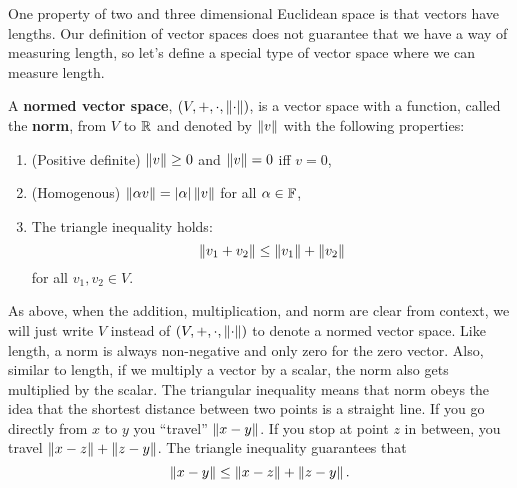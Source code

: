 One property of two and three dimensional Euclidean space is that
vectors have lengths. Our definition of vector spaces does not
guarantee that we have a way of measuring length, so let's define a
special type of vector space where we can measure length. 
\begin{definition}
  A \textbf{normed vector space}, $(V,+,\cdot, \left\Vert {\cdot} \right\Vert)$, is a
  vector space with a function, called the \textbf{norm}, from $V$ to
  $\mathbb{R}$ and denoted by $\left\Vert {v} \right\Vert$ with the following properties:
  \begin{enumerate}
  \item (Positive definite) $\left\Vert {v} \right\Vert \geq 0$ and $\left\Vert {v} \right\Vert = 0$ iff $v = 0$,
  \item (Homogenous) $\left\Vert {\alpha v} \right\Vert = |\alpha|\left\Vert {v} \right\Vert$ for all $\alpha \in \mathbb{F}$,
  \item The triangle inequality holds:
    \[ \left\Vert {v_1+v_2} \right\Vert \leq \left\Vert {v_1} \right\Vert + \left\Vert {v_2} \right\Vert \]
    for all $v_1, v_2 \in V$.
  \end{enumerate}
\end{definition}
As above, when the addition, multiplication,
and norm are clear from context, we will just write $V$ instead of
$(V,+,\cdot, \left\Vert {\cdot} \right\Vert)$ to denote a normed vector space. 
Like length, a norm is always non-negative and only zero for the zero
vector. Also, similar to length, if we multiply a vector by a scalar,
the norm also gets multiplied by the scalar. The triangular inequality
means that norm obeys the idea that the shortest distance between two
points is a straight line. If you go directly from $x$ to $y$ you
``travel'' $\left\Vert {x - y} \right\Vert$. If you stop at point $z$ in between, you travel
$\left\Vert {x - z} \right\Vert + \left\Vert {z - y} \right\Vert$. The triangle inequality guarantees that 
\[ \left\Vert {x-y} \right\Vert \leq \left\Vert {x - z} \right\Vert + \left\Vert {z - y} \right\Vert. \]

